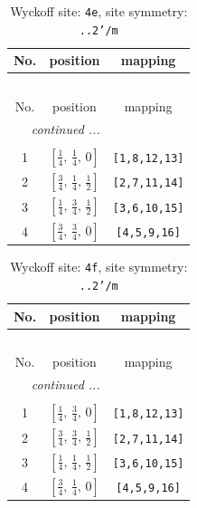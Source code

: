 \documentclass[fleqn,8pt]{jsarticle}
\begin{document}
\renewcommand{\arraystretch}{1.2}
\begin{longtable}{ccc}
\caption{Wyckoff site: {\tt 4e}, site symmetry: {\tt ..2'/m}}
 \\
 \hline \hline
No. & position & mapping \\ \hline \endfirsthead

\multicolumn{2}{l}{\tablename\ \thetable{}} \\
 \hline \hline
No. & position & mapping \\ \hline \endhead

 \hline \hline
\multicolumn{2}{r}{\footnotesize\it continued ...} \\ \endfoot

 \hline \hline
\multicolumn{2}{r}{} \\ \endlastfoot

1 & $\left[ \frac{1}{4},\, \frac{1}{4},\, 0 \right]$ & {\tt [1,8,12,13]} \\ \hline
2 & $\left[ \frac{3}{4},\, \frac{1}{4},\, \frac{1}{2} \right]$ & {\tt [2,7,11,14]} \\ \hline
3 & $\left[ \frac{1}{4},\, \frac{3}{4},\, \frac{1}{2} \right]$ & {\tt [3,6,10,15]} \\ \hline
4 & $\left[ \frac{3}{4},\, \frac{3}{4},\, 0 \right]$ & {\tt [4,5,9,16]} \\
\end{longtable}
\renewcommand{\arraystretch}{1.2}
\begin{longtable}{ccc}
\caption{Wyckoff site: {\tt 4f}, site symmetry: {\tt ..2'/m}}
 \\
 \hline \hline
No. & position & mapping \\ \hline \endfirsthead

\multicolumn{2}{l}{\tablename\ \thetable{}} \\
 \hline \hline
No. & position & mapping \\ \hline \endhead

 \hline \hline
\multicolumn{2}{r}{\footnotesize\it continued ...} \\ \endfoot

 \hline \hline
\multicolumn{2}{r}{} \\ \endlastfoot

1 & $\left[ \frac{1}{4},\, \frac{3}{4},\, 0 \right]$ & {\tt [1,8,12,13]} \\ \hline
2 & $\left[ \frac{3}{4},\, \frac{3}{4},\, \frac{1}{2} \right]$ & {\tt [2,7,11,14]} \\ \hline
3 & $\left[ \frac{1}{4},\, \frac{1}{4},\, \frac{1}{2} \right]$ & {\tt [3,6,10,15]} \\ \hline
4 & $\left[ \frac{3}{4},\, \frac{1}{4},\, 0 \right]$ & {\tt [4,5,9,16]} \\
\end{longtable}
\end{document}
